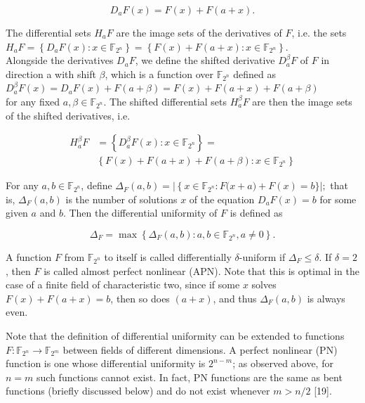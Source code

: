 \documentclass[10pt]{article}
\begin{document}
$$
D_{a} F(x)=F(x)+F(a+x) .
$$

The differential sets $H_{a} F$ are the image sets of the derivatives of $F$, i.e. the sets\\
$H_{a} F=\left\{D_{a} F(x): x \in \mathbb{F}_{2^{n}}\right\}=\left\{F(x)+F(a+x): x \in \mathbb{F}_{2^{n}}\right\}$.\\
Alongside the derivatives $D_{a} F$, we define the shifted derivative $D_{a}^{\beta} F$ of $F$ in direction a with shift $\beta$, which is a function over $\mathbb{F}_{2^{n}}$ defined as\\
$D_{a}^{\beta} F(x)=D_{a} F(x)+F(a+\beta)=F(x)+F(a+x)+F(a+\beta)$\\
for any fixed $a, \beta \in \mathbb{F}_{2^{n}}$. The shifted differential sets $H_{a}^{\beta} F$ are then the image sets of the shifted derivatives, i.e.

$$
\begin{aligned}
H_{a}^{\beta} F & =\left\{D_{a}^{\beta} F(x): x \in \mathbb{F}_{2^{n}}\right\}= \\
& \left\{F(x)+F(a+x)+F(a+\beta): x \in \mathbb{F}_{2^{n}}\right\}
\end{aligned}
$$

For any $a, b \in \mathbb{F}_{2^{n}}$, define $\Delta_{F}(a, b)=\mid\left\{x \in \mathbb{F}_{2^{n}}: F(x+\right. a)+F(x)=b\} \mid ;$ that is, $\Delta_{F}(a, b)$ is the number of solutions $x$ of the equation $D_{a} F(x)=b$ for some given $a$ and $b$. Then the differential uniformity of $F$ is defined as

$$
\Delta_{F}=\max \left\{\Delta_{F}(a, b): a, b \in \mathbb{F}_{2^{n}}, a \neq 0\right\} .
$$

A function $F$ from $\mathbb{F}_{2^{n}}$ to itself is called differentially $\delta$-uniform if $\Delta_{F} \leq \delta$. If $\delta=2$, then $F$ is called almost perfect nonlinear (APN). Note that this is optimal in the case of a finite field of characteristic two, since if some $x$ solves $F(x)+F(a+x)=b$, then so does $(a+x)$, and thus $\Delta_{F}(a, b)$ is always even.

Note that the definition of differential uniformity can be extended to functions $F: \mathbb{F}_{2^{n}} \rightarrow \mathbb{F}_{2^{m}}$ between fields of different dimensions. A perfect nonlinear (PN) function is one whose differential uniformity is $2^{n-m}$; as observed above, for $n=m$ such functions cannot exist. In fact, PN functions are the same as bent functions (briefly discussed below) and do not exist whenever $m>n / 2$ [19].
\end{document}
